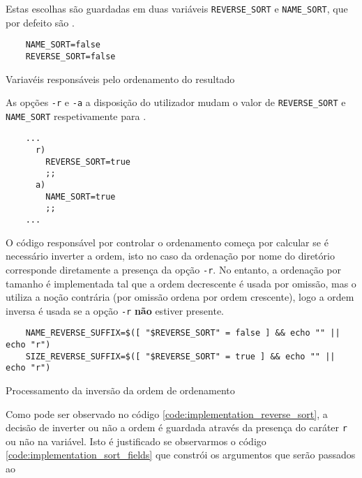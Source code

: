 Estas escolhas são guardadas em duas variáveis \Verb|REVERSE_SORT| e
\Verb|NAME_SORT|, que por defeito são .

\begin{listing}[H]
	\centering
	\begin{verbatim}
    NAME_SORT=false
    REVERSE_SORT=false
  \end{verbatim}
	\caption{Variavéis responsáveis pelo ordenamento do resultado}
\end{listing}

As opções \Verb|-r| e \Verb|-a| a disposição do utilizador mudam o valor de
\Verb|REVERSE_SORT| e \Verb|NAME_SORT| respetivamente para .

\begin{listing}[H]
	\centering
	\begin{verbatim}
    ...
      r)
        REVERSE_SORT=true
        ;;
      a)
        NAME_SORT=true
        ;;
    ...
  \end{verbatim}
	\cprotect\caption{Processamento das opções \Verb|-r| e \Verb|-a|}
\end{listing}

O código responsável por controlar o ordenamento começa por calcular se é
necessário inverter a ordem, isto no caso da ordenação por nome do diretório
corresponde diretamente a presença da opção \Verb|-r|. No entanto, a ordenação
por tamanho é implementada tal que a ordem decrescente é usada por omissão,
mas o  utiliza a noção contrária (por omissão ordena por ordem
crescente), logo a ordem inversa é usada se a opção \Verb|-r| \textbf{não}
estiver presente.

\begin{listing}[H]
	\centering
	\begin{verbatim}
    NAME_REVERSE_SUFFIX=$([ "$REVERSE_SORT" = false ] && echo "" || echo "r")
    SIZE_REVERSE_SUFFIX=$([ "$REVERSE_SORT" = true ] && echo "" || echo "r")
  \end{verbatim}
	\caption{Processamento da inversão da ordem de ordenamento}
	\label{code:implementation_reverse_sort}
\end{listing}

Como pode ser observado no código \ref{code:implementation_reverse_sort}, a
decisão de inverter ou não a ordem é guardada através da presença do caráter
\Verb|r| ou não na variável. Isto é justificado se observarmos o código
\ref{code:implementation_sort_fields} que constrói os argumentos que serão
passados ao 

